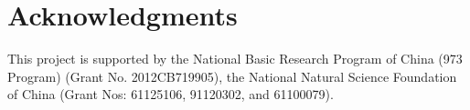 \documentclass{sig-alternate}
\begin{document}
\section{Acknowledgments}
This project is supported by the National Basic Research Program of China (973 Program) (Grant No. 2012CB719905), the National Natural Science Foundation of China (Grant Nos: 61125106, 91120302, and 61100079).

%

%
%
\end{document}
